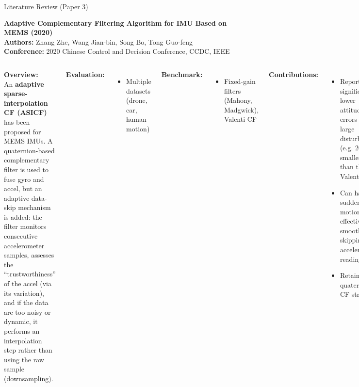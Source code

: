 \documentclass[aspectratio=169,xcolor=dvipsnames]{beamer}
\begin{document}
\begin{frame}{Literature Review (Paper 3)}

\textbf{Adaptive Complementary Filtering Algorithm for IMU Based on MEMS (2020)} \hfill \textcolor{blue}{\cite{wang2020mems}}\\
\textbf{Authors:} Zhang Zhe, Wang Jian-bin, Song Bo, Tong Guo-feng \\
\textbf{Conference:} 2020 Chinese Control and Decision Conference, CCDC, IEEE

\vspace{1em}
\scriptsize
\begin{columns}
    \textbf{Overview:}\\
    An \textbf{adaptive sparse-interpolation CF (ASICF)} has been proposed for MEMS IMUs. A quaternion-based complementary filter is used to fuse gyro and accel, but an adaptive data-skip mechanism is added: the filter monitors consecutive accelerometer samples, assesses the “trustworthiness” of the accel (via its variation), and if the data are too noisy or dynamic, it performs an interpolation step rather than using the raw sample (downsampling).

    \vspace{0.5em}
    \textbf{Evaluation:}
    \begin{itemize}
        \item Multiple datasets (drone, car, human motion)
    \end{itemize}
    
    \textbf{Benchmark:}
    \begin{itemize}
        \item Fixed-gain filters (Mahony\textcolor{blue}{\cite{mahony2008nonlinear}}, Madgwick\textcolor{blue}{\cite{madgwick2011estimation}}), Valenti CF\textcolor{blue}{\cite{valentiCF2015}}
    \end{itemize}

    \textbf{Contributions:}
    \begin{itemize}
        \item  Reported significantly lower attitude errors under large disturbances (e.g. 20\% smaller error than the Valenti CF \textcolor{blue}{\cite{valentiCF2015}}). 
        \item Can handle sudden motions by effectively smoothing or skipping bad accelerometer readings.
        \item Retains quaternion CF structure.
    \end{itemize}

    \vspace{0.5em}
    \textbf{Disadvantages:}
    \begin{itemize}
        \item Performance depends on correctly detecting outliers.
        \item May introduce lagging when interpolating
    \end{itemize}
\end{columns}

\end{frame}
\end{document}
